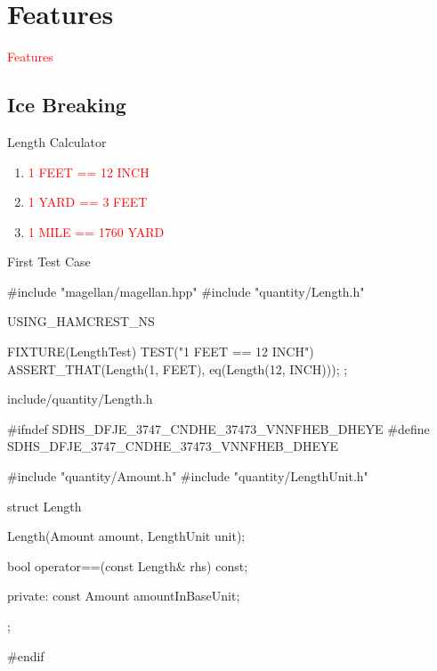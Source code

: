 \section{Features}
\label{sec:features}

\begin{frame}
  \begin{center}
    \Huge{\textcolor{red}{Features}}
  \end{center}
\end{frame}

\subsection{Ice Breaking}

\begin{frame}{Length Calculator}
  \begin{enumerate}
    \item \textcolor{red}{1 FEET == 12 INCH}
    \item \textcolor{red}{1 YARD == 3 FEET}
    \item \textcolor{red}{1 MILE == 1760 YARD}
  \end{enumerate}
\end{frame}

\begin{frame}[fragile]{First Test Case}
\begin{c++}
#include "magellan/magellan.hpp"
#include "quantity/Length.h"

USING_HAMCREST_NS

FIXTURE(LengthTest)
{
    TEST("1 FEET == 12 INCH")
    {
        ASSERT_THAT(Length(1, FEET), eq(Length(12, INCH)));
    }
};
\end{c++}
\end{frame}

\begin{frame}[fragile]{include/quantity/Length.h}
\begin{c++}
#ifndef SDHS_DFJE_3747_CNDHE_37473_VNNFHEB_DHEYE
#define SDHS_DFJE_3747_CNDHE_37473_VNNFHEB_DHEYE

#include "quantity/Amount.h"
#include "quantity/LengthUnit.h"

struct Length
{
    Length(Amount amount, LengthUnit unit);

    bool operator==(const Length& rhs) const;

private:
    const Amount amountInBaseUnit;
};

#endif
\end{c++}
\end{frame}


